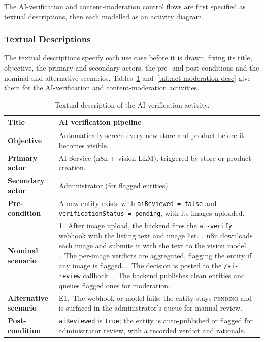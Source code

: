 The AI-verification and content-moderation control flows are first
specified as textual descriptions, then each modelled as an activity
diagram.

\subsubsection{Textual Descriptions}

The textual descriptions specify each use case before it is drawn, fixing
its title, objective, the primary and secondary actors, the pre- and
post-conditions and the nominal and alternative scenarios.
Tables~\ref{tab:act-aiverify-desc} and~\ref{tab:act-moderation-desc} give
them for the AI-verification and content-moderation activities.

\begin{table}[H]
  \centering
  \caption{Textual description of the AI-verification activity.}
  \label{tab:act-aiverify-desc}
  \renewcommand{\arraystretch}{1.3}
  \begin{tabularx}{\textwidth}{|>{\bfseries}p{3.2cm}|X|}
    \hline
    Title & AI verification pipeline \\ \hline
    Objective & Automatically screen every new store and product before it becomes visible. \\ \hline
    Primary actor & AI Service (n8n + vision LLM), triggered by store or product creation. \\ \hline
    Secondary actor & Administrator (for flagged entities). \\ \hline
    Pre-condition & A new entity exists with \texttt{aiReviewed = false} and \texttt{verificationStatus = pending}, with its images uploaded. \\ \hline
    Nominal scenario & 1.~After image upload, the backend fires the \texttt{ai-verify} webhook with the listing text and image list. \newline 2.~n8n downloads each image and submits it with the text to the vision model. \newline 3.~The per-image verdicts are aggregated, flagging the entity if any image is flagged. \newline 4.~The decision is posted to the \texttt{/ai-review} callback. \newline 5.~The backend publishes clean entities and queues flagged ones for moderation. \\ \hline
    Alternative scenario & E1.~The webhook or model fails: the entity stays \textsc{pending} and is surfaced in the administrator's queue for manual review. \\ \hline
    Post-condition & \texttt{aiReviewed} is \texttt{true}; the entity is auto-published or flagged for administrator review, with a recorded verdict and rationale. \\ \hline
  \end{tabularx}
\end{table}

